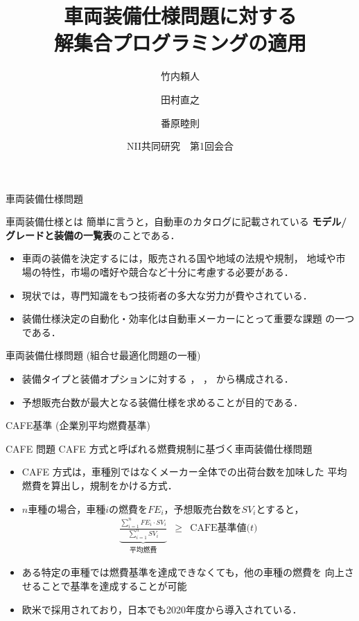 \documentclass[dvipdfmx, 11pt]{beamer}
\title{車両装備仕様問題に対する\\解集合プログラミングの適用}
\author{竹内頼人\inst{1} \and 田村直之\inst{2} \and 番原睦則\inst{1}}
\institute{\inst{1}名古屋大学 大学院情報学研究科 \and \inst{2}神戸大学 情報基盤センター}
\date{NII共同研究　第1回会合}
\begin{document}
\frame{\titlepage}
\begin{frame}{車両装備仕様問題}
  \begin{alertblock}{車両装備仕様とは}
    簡単に言うと，自動車のカタログに記載されている
    \textbf{モデル/グレードと装備の一覧表}のことである．
  \end{alertblock}

  \begin{itemize}
  \item 車両の装備を決定するには，販売される国や地域の法規や規制，
    地域や市場の特性，市場の嗜好や競合など十分に考慮する必要がある．
  \item 現状では，専門知識をもつ技術者の多大な労力が費やされている．
  \item 装備仕様決定の自動化・効率化は自動車メーカーにとって重要な課題
    の一つである．
  \end{itemize}

  \begin{block}{車両装備仕様問題 (組合せ最適化問題の一種)}
    \begin{itemize}
    \item 装備タイプと装備オプションに対する
      ，
      ，
      から構成される．
    \item 予想販売台数が最大となる装備仕様を求めることが目的である．
    \end{itemize}
  \end{block}
\end{frame}
\begin{frame}{CAFE基準 (企業別平均燃費基準)}
  \begin{alertblock}{CAFE 問題}\centering
    CAFE 方式と呼ばれる燃費規制に基づく車両装備仕様問題~\footnotemark
  \end{alertblock}

  \begin{itemize}
  \item CAFE 方式は，車種別ではなくメーカー全体での出荷台数を加味した
    平均燃費を算出し，規制をかける方式．
  \item $n$車種の場合，車種$i$の燃費を$FE_i$，予想販売台数を$SV_i$とすると，
    \[
      \begin{array}{lcr}
        \underbrace{
        \frac{\sum_{i=1}^{n} FE_{i}\cdot SV_{i}}
        {\sum_{i=1}^{n} SV_{i}}}_{\textrm{平均燃費}
        }
        &
        \geq 
        &
        \textrm{CAFE基準値($t$)}
      \end{array}
    \]
  \item ある特定の車種では燃費基準を達成できなくても，他の車種の燃費を
    向上させることで基準を達成することが可能
  \item 欧米で採用されており，日本でも2020年度から導入されている．
  \end{itemize}
\end{frame}
\end{document}
